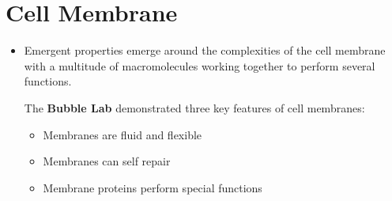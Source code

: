 \documentclass[letterpaper]{article}
\numberwithin{equation}{section}
\theoremstyle{classic}
\begin{document}
\section{Cell Membrane}
\begin{itemize}
\item Emergent properties emerge around the complexities of the cell membrane with a multitude of macromolecules working together to perform several functions.
\begin{lab}
    The \textbf{Bubble Lab} demonstrated three key features of cell membranes:
    \begin{itemize}
        \item Membranes are fluid and flexible
        \item Membranes can self repair
        \item Membrane proteins perform special functions
    \end{itemize}
\end{lab}

\end{itemize}
\end{document}
